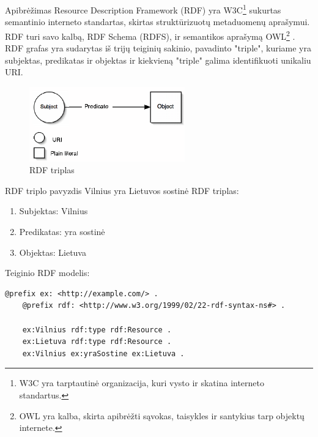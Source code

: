 \documentclass[10pt]{beamer}
\begin{document}
\begin{frame}[fragile]{Apibrėžimas}
    Resource Description Framework (RDF) yra W3C\footnote{W3C yra tarptautinė organizacija, kuri vysto ir skatina interneto standartus.} sukurtas semantinio interneto standartas, skirtas struktūrizuotų metaduomenų aprašymui. RDF turi savo kalbą, RDF Schema (RDFS), ir semantikos aprašymą OWL\footnote{OWL yra kalba, skirta apibrėžti sąvokas, taisykles ir santykius tarp objektų internete.} \cite{wiki:rdf}. RDF grafas yra sudarytas iš trijų teiginių sakinio, pavadinto "triple", kuriame yra subjektas, predikatas ir objektas ir kiekvieną "triple" galima identifikuoti unikaliu URI.
     \begin{figure}[htbp]
          \centering
          \includegraphics[width=0.6\textwidth]{img/rdf_triple.png}
          \caption{RDF triplas \cite{distributed_search}}
          \label{fig:vertex}
    \end{figure}
\end{frame}

\begin{frame}[fragile]{RDF triplo pavyzdis}
    Vilnius yra Lietuvos sostinė RDF triplas:
    \begin{enumerate}
        \item Subjektas: Vilnius
        \item Predikatas: yra sostinė
        \item Objektas: Lietuva
    \end{enumerate}

    Teiginio RDF modelis:
    \begin{lstlisting}[captionpos=b, caption=Teiginio RDF modelis, label=lst:rdf,
    basicstyle=\ttfamily\scriptsize,frame=single,breaklines=true]
    @prefix ex: <http://example.com/> .
    @prefix rdf: <http://www.w3.org/1999/02/22-rdf-syntax-ns#> .
    
    ex:Vilnius rdf:type rdf:Resource .
    ex:Lietuva rdf:type rdf:Resource .
    ex:Vilnius ex:yraSostine ex:Lietuva .
    \end{lstlisting}
\end{frame}
\end{document}
